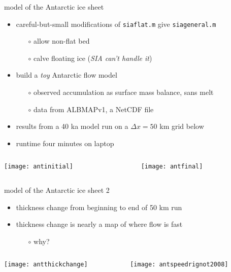 \begin{frame}{model of the Antarctic ice sheet}

\normalsize
\begin{itemize}
\item careful-but-small modifications of \texttt{siaflat.m} give \texttt{siageneral.m}
  \begin{itemize}
  \item[$\circ$] allow non-flat bed
  \item[$\circ$] calve floating ice (\emph{SIA can't handle it})
  \end{itemize}
\item build a \emph{toy} Antarctic flow model
  \begin{itemize}
  \item[$\circ$] observed accumulation as surface mass balance, sans melt
  \item[$\circ$] data from ALBMAPv1, a NetCDF file
  \end{itemize}
\item results from a 40 ka model run on a $\Delta x=50$ km grid below
\item runtime four minutes on laptop
\end{itemize}

\bigskip

\begin{columns}
\begin{column}{0.4\textwidth}
\texttt{[image: antinitial]}
\end{column}
\begin{column}{0.55\textwidth}
\texttt{[image: antfinal]}
\end{column}
\end{columns}
\end{frame}


\begin{frame}{model of the Antarctic ice sheet 2}

\normalsize
\begin{itemize}
\item thickness change from beginning to end of 50 km run
\item thickness change is nearly a map of where flow is fast
  \begin{itemize}
  \item[$\circ$] why?
  \end{itemize}  
\end{itemize}

\bigskip
\begin{columns}
\begin{column}{0.6\textwidth}
\texttt{[image: antthickchange]}
\end{column}
\begin{column}{0.4\textwidth}
\texttt{[image: antspeedrignot2008]}
\end{column}
\end{columns}
\end{frame}


